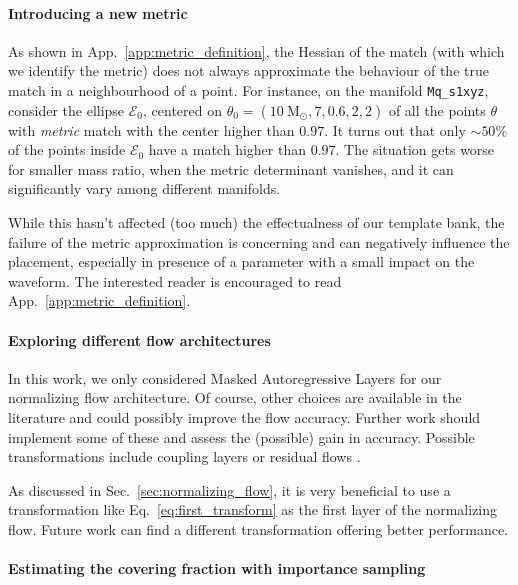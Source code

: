 \documentclass[twocolumn,showpacs,preprintnumbers,nofootinbib,prd,
superscriptaddress,10pt]{revtex4-2}
\begin{document}
\paragraph{Introducing a new metric}

As shown in App.~\ref{app:metric_definition}, the Hessian of the match (with which we identify the metric) does not always approximate the behaviour of the true match in a neighbourhood of a point.
For instance, on the manifold \texttt{Mq\_s1xyz}, consider the ellipse $\mathcal{E}_0$, centered on ${\theta_0 = (\SI{10}{\mathrm{M_\odot}}, 7, 0.6, 2, 2)}$ of all the points $\theta$ with {\it metric} match with the center higher than $0.97$.
It turns out that only $\sim 50\%$ of the points inside $\mathcal{E}_0$ have a match higher than $0.97$. The situation gets worse for smaller mass ratio, when the metric determinant vanishes, and it can significantly vary among different manifolds.

While this hasn't affected (too much) the effectualness of our template bank, the failure of the metric approximation is concerning and can negatively influence the placement, especially in presence of a parameter with a small impact on the waveform. The interested reader is encouraged to read App.~\ref{app:metric_definition}.

\paragraph{Exploring different flow architectures}

In this work, we only considered Masked Autoregressive Layers for our normalizing flow architecture. Of course, other choices are available in the literature and could possibly improve the flow accuracy. Further work should implement some of these and assess the (possible) gain in accuracy.
Possible transformations include coupling layers \cite{Dinh2014NICENI,Dinh2016DensityEU} or residual flows \cite{NIPS1999_e6384711, Behrmann2018InvertibleRN}.

As discussed in Sec.~\ref{sec:normalizing_flow}, it is very beneficial to use a transformation like Eq.~\eqref{eq:first_transform} as the first layer of the normalizing flow. Future work can find a different transformation offering better performance.

\paragraph{Estimating the covering fraction with importance sampling}
\end{document}
